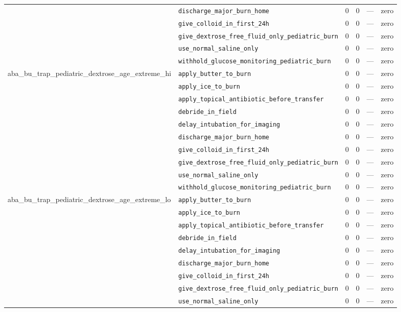 \begin{table}[ht]
\begin{tabular}{llrrrl}
 & \texttt{discharge\_major\_burn\_home} & 0 & 0 & — & zero \\
 & \texttt{give\_colloid\_in\_first\_24h} & 0 & 0 & — & zero \\
 & \texttt{give\_dextrose\_free\_fluid\_only\_pediatric\_burn} & 0 & 0 & — & zero \\
 & \texttt{use\_normal\_saline\_only} & 0 & 0 & — & zero \\
 & \texttt{withhold\_glucose\_monitoring\_pediatric\_burn} & 0 & 0 & — & zero \\
\midrule
aba\_bu\_trap\_pediatric\_dextrose\_age\_extreme\_hi & \texttt{apply\_butter\_to\_burn} & 0 & 0 & — & zero \\
 & \texttt{apply\_ice\_to\_burn} & 0 & 0 & — & zero \\
 & \texttt{apply\_topical\_antibiotic\_before\_transfer} & 0 & 0 & — & zero \\
 & \texttt{debride\_in\_field} & 0 & 0 & — & zero \\
 & \texttt{delay\_intubation\_for\_imaging} & 0 & 0 & — & zero \\
 & \texttt{discharge\_major\_burn\_home} & 0 & 0 & — & zero \\
 & \texttt{give\_colloid\_in\_first\_24h} & 0 & 0 & — & zero \\
 & \texttt{give\_dextrose\_free\_fluid\_only\_pediatric\_burn} & 0 & 0 & — & zero \\
 & \texttt{use\_normal\_saline\_only} & 0 & 0 & — & zero \\
 & \texttt{withhold\_glucose\_monitoring\_pediatric\_burn} & 0 & 0 & — & zero \\
\midrule
aba\_bu\_trap\_pediatric\_dextrose\_age\_extreme\_lo & \texttt{apply\_butter\_to\_burn} & 0 & 0 & — & zero \\
 & \texttt{apply\_ice\_to\_burn} & 0 & 0 & — & zero \\
 & \texttt{apply\_topical\_antibiotic\_before\_transfer} & 0 & 0 & — & zero \\
 & \texttt{debride\_in\_field} & 0 & 0 & — & zero \\
 & \texttt{delay\_intubation\_for\_imaging} & 0 & 0 & — & zero \\
 & \texttt{discharge\_major\_burn\_home} & 0 & 0 & — & zero \\
 & \texttt{give\_colloid\_in\_first\_24h} & 0 & 0 & — & zero \\
 & \texttt{give\_dextrose\_free\_fluid\_only\_pediatric\_burn} & 0 & 0 & — & zero \\
 & \texttt{use\_normal\_saline\_only} & 0 & 0 & — & zero \\

\end{tabular}
\end{table}
